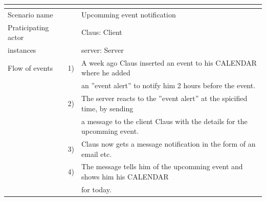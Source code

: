 \documentclass{article}
\begin{document}
\begin{tabular}{l r @{} l}
	\multicolumn{2}{c}{} \\
	\hline
	Scenario name	&&Upcomming event notification\\
	\hline
	Praticipating actor	&&Claus: Client \\
	instances       	&&server: Server\\
	\hline
	Flow of events	&1)&A week ago Claus inserted an event to his CALENDAR where he added\\ 
					&&an ''event alert'' to notify him 2 hours before the event.\\
				&2)&The server reacts to the ''event alert'' at the spicified time, by sending\\
					&&a message to the client Claus with the details for the upcomming event.\\
				&3)&Claus now gets a message notification in the form of an email etc.\\ 
				&4)&The message tells him of the upcomming event and shows him his CALENDAR\\
					&&for today.\\
	\hline
\end{tabular}
\end{document}
